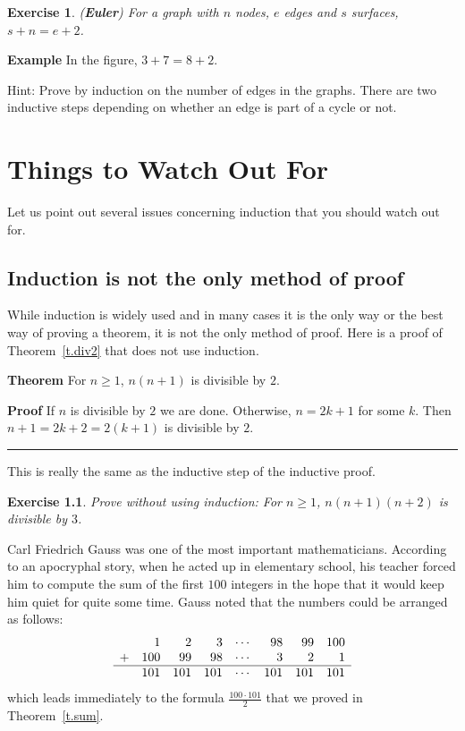\documentclass[11pt,a4paper]{report}
\newcommand*{\qed}{\hfill\rule{1ex}{1.5ex}}
\newtheorem{exercise}{Exercise}
\begin{document}
\begin{exercise} (\textbf{Euler})
For a graph with $n$ nodes, $e$ edges and $s$ surfaces, $s+n=e+2$.
\end{exercise}
\textbf{Example} In the figure, $3+7=8+2$.

Hint: Prove by induction on the number of edges in the graphs. There are two inductive steps depending on whether an edge is part of a cycle or not.


\chapter{Things to Watch Out For}\label{s.watch}

Let us point out several issues concerning induction that you should watch out for.

\section{Induction is not the only method of proof}

While induction is widely used and in many cases it is the only way or the best way of proving a theorem, it is not the only method of proof. Here is a proof of Theorem~\ref{t.div2} that does not use induction.

\textbf{Theorem} For $n\geq 1$, $n(n+1)$ is divisible by $2$.

\textbf{Proof} If $n$ is divisible by $2$ we are done. Otherwise, $n=2k+1$ for some $k$. Then $n+1=2k+2=2(k+1)$ is divisible by $2$.\qed

This is really the same as the inductive step of the inductive proof.

\begin{exercise} Prove without using induction: For $n\geq 1$, $n(n+1)(n+2)$ is divisible by $3$.
\end{exercise}

Carl Friedrich Gauss was one of the most important mathematicians. According to an apocryphal story, when he acted up in elementary school, his teacher forced him to compute the sum of the first $100$ integers in the hope that it would keep him quiet for quite some time. Gauss noted that the numbers could be arranged as follows:
\[
\begin{array}{crrrrrrr}
& 1 & 2 & 3 & \cdots & 98 & 99 & 100\\
+& 100 & 99 & 98 & \cdots & 3 & 2 & 1\\
\hline
& 101 & 101 & 101 & \cdots & 101 & 101 & 101\\
\end{array}
\]
which leads immediately to the formula $\frac{100\cdot 101}{2}$ that we proved in Theorem~\ref{t.sum}. 
\end{document}
